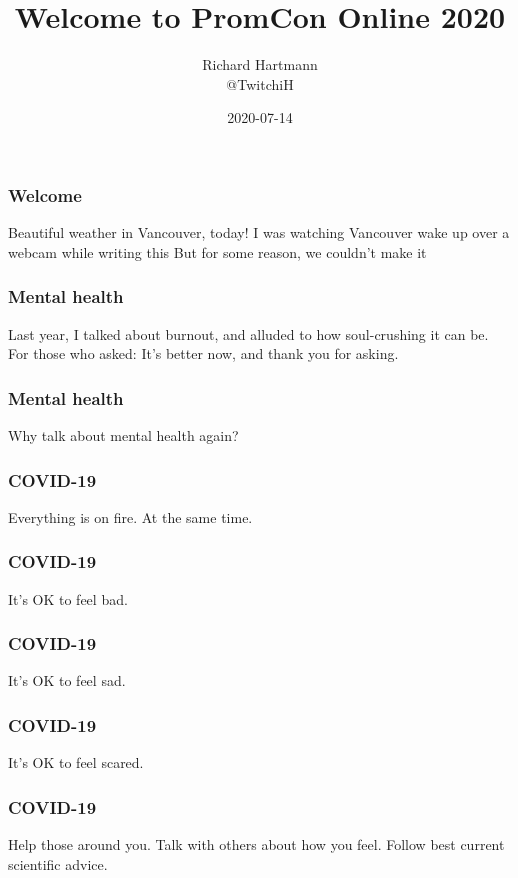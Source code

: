 \documentclass[aspectratio=169]{beamer}
\title{Welcome to PromCon Online 2020}
\subtitle{}
\author{Richard Hartmann\\
@TwitchiH}
\date{2020-07-14}
\begin{document}



\begin{frame}
	\titlepage
\end{frame}

\begin{frame}
	\frametitle{Welcome}
	\centering
	\vfill
	Beautiful weather in Vancouver, today!
	\vfill
	I was watching Vancouver wake up over a webcam while writing this
	\vfill
	But for some reason, we couldn't make it
	\vfill
\end{frame}

\begin{frame}
	\frametitle{Mental health}
	\centering
	\vfill
	Last year, I talked about burnout, and alluded to how soul-crushing it can be.
	\vfill
	For those who asked: It's better now, and thank you for asking.
	\vfill
\end{frame}

\begin{frame}
	\frametitle{Mental health}
	\centering
	\vfill
	Why talk about mental health again?
	\vfill
\end{frame}

\begin{frame}
	\frametitle{COVID-19}
	\centering
	\vfill
	Everything is on fire. At the same time.
	\vfill
\end{frame}

\begin{frame}
	\frametitle{COVID-19}
	\centering
	\vfill
	It's OK to feel bad.
	\vfill
\end{frame}

\begin{frame}
	\frametitle{COVID-19}
	\centering
	\vfill
	It's OK to feel sad.
	\vfill
\end{frame}

\begin{frame}
	\frametitle{COVID-19}
	\centering
	\vfill
	It's OK to feel scared.
	\vfill
\end{frame}

\begin{frame}
	\frametitle{COVID-19}
	\centering
	\vfill
	Help those around you.
	\vfill
	Talk with others about how you feel.
	\vfill
	Follow best current scientific advice.
	\vfill
\end{frame}
\end{document}

